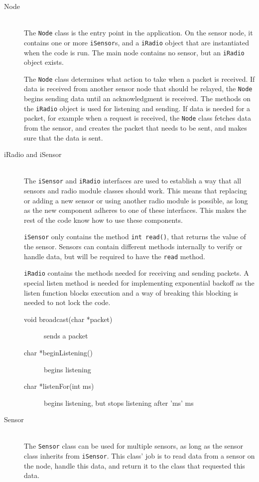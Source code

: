 \begin{description}
\item[Node] \hfill \\
The \texttt{Node} class is the entry point in the application.
On the sensor node, it contains one or more \texttt{iSensor}s, and a \texttt{iRadio} object that are instantiated when the code is run. The main node contains no sensor, but an \texttt{iRadio} object exists.

The \texttt{Node} class determines what action to take when a packet is received. If data is received from another sensor node that should be relayed, the \texttt{Node} begins sending data until an acknowledgment is received. The methods on the \texttt{iRadio} object is used for listening and sending.
If data is needed for a packet, for example when a request is received, the \texttt{Node} class fetches data from the sensor, and creates the packet that needs to be sent, and makes sure that the data is sent.

\item[iRadio and iSensor] \hfill \\
The \texttt{iSensor} and \texttt{iRadio} interfaces are used to establish a way that all sensors and radio module classes should work. This means that replacing or adding a new sensor or using another radio module is possible, as long as the new component adheres to one of these interfaces. This makes the rest of the code know how to use these components. 

\texttt{iSensor} only contains the method \texttt{int read()}, that returns the value of the sensor. Sensors can contain different methods internally to verify or handle data, but will be required to have the \texttt{read} method.

\texttt{iRadio} contains the methods needed for receiving and sending packets. A special listen method is needed for implementing exponential backoff as the listen function blocks execution and a way of breaking this blocking is needed to not lock the code.
\begin{description}
\item[void broadcast(char *packet)] sends a packet
\item[char *beginListening()] begins listening
\item[char *listenFor(int ms)] begins listening, but stops listening after 'ms' ms
\end{description}

\item[Sensor] \hfill \\
The \texttt{Sensor} class can be used for multiple sensors, as long as the sensor class inherits from \texttt{iSensor}. This class' job is to read data from a sensor on the node, handle this data, and return it to the class that requested this data.


\end{description}
